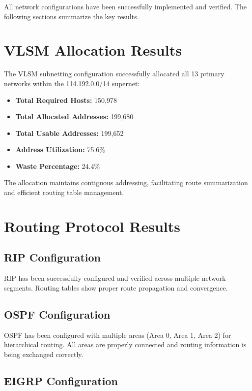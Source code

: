 \documentclass[12pt,a4paper]{report}
\begin{document}
All network configurations have been successfully implemented and verified. The following sections summarize the key results.

\section{VLSM Allocation Results}

The VLSM subnetting configuration successfully allocated all 13 primary networks within the 114.192.0.0/14 supernet:

\begin{itemize}
    \item \textbf{Total Required Hosts:} 150,978
    \item \textbf{Total Allocated Addresses:} 199,680
    \item \textbf{Total Usable Addresses:} 199,652
    \item \textbf{Address Utilization:} 75.6\%
    \item \textbf{Waste Percentage:} 24.4\%
\end{itemize}

The allocation maintains contiguous addressing, facilitating route summarization and efficient routing table management.

\section{Routing Protocol Results}

\subsection{RIP Configuration}

RIP has been successfully configured and verified across multiple network segments. Routing tables show proper route propagation and convergence.

\subsection{OSPF Configuration}

OSPF has been configured with multiple areas (Area 0, Area 1, Area 2) for hierarchical routing. All areas are properly connected and routing information is being exchanged correctly.

\subsection{EIGRP Configuration}
\end{document}
